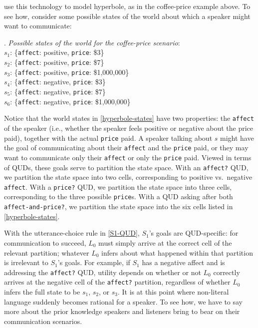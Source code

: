 \documentclass[10pt,letterpaper]{article}
\begin{document}
\cite{kaoetal2014} use this technology to model hyperbole, as in the coffee-price example above. To see how, consider some possible states of the world about which a speaker might want to communicate:

\ex. \label{hyperbole-states}
\emph{Possible states of the world for the coffee-price scenario}:\\
$s_1$: \{\texttt{affect}: positive, \texttt{price}: \$3\}\\
$s_2$: \{\texttt{affect}: positive, \texttt{price}: \$7\}\\
$s_3$: \{\texttt{affect}: positive, \texttt{price}: \$1,000,000\}\\
$s_4$: \{\texttt{affect}: negative, \texttt{price}: \$3\}\\
$s_5$: \{\texttt{affect}: negative, \texttt{price}: \$7\}\\
$s_6$: \{\texttt{affect}: negative, \texttt{price}: \$1,000,000\}

Notice that the world states in \ref{hyperbole-states} have two properties: the \texttt{affect} of the speaker (i.e., whether the speaker feels positive or negative about the price paid), together with the actual \texttt{price} paid. A speaker talking about $s$ might have the goal of communicating about their \texttt{affect} and the \texttt{price} paid, or they may want to communicate only their \texttt{affect} or only the \texttt{price} paid. Viewed in terms of QUDs, these goals serve to partition the state space. With an \texttt{affect?} QUD, we partition the state space into two cells, corresponding to positive vs.~negative \texttt{affect}. With a \texttt{price?} QUD, we partition the state space into three cells, corresponding to the three possible \texttt{price}s. With a QUD asking after both \texttt{affect-and-price?}, we partition the state space into the six cells listed in \ref{hyperbole-states}.

With the utterance-choice rule in \eqref{S1-QUD}, $S_1$'s goals are QUD-specific: for communication to succeed, $L_0$ must simply arrive at the correct cell of the relevant partition; whatever $L_0$ infers about what happened within that partition is irrelevant to $S_1$'s goals. For example, if $S_1$ has a negative affect and is addressing the \texttt{affect?} QUD, utility depends on whether or not $L_0$ correctly arrives at the negative cell of the \texttt{affect?} partition, regardless of whether $L_0$ infers the full state to be $s_1$, $s_2$, or $s_3$. It is at this point where non-literal language suddenly becomes rational for a speaker. To see how, we have to say more about the prior knowledge speakers and listeners bring to bear on their communication scenarios.
\end{document}

